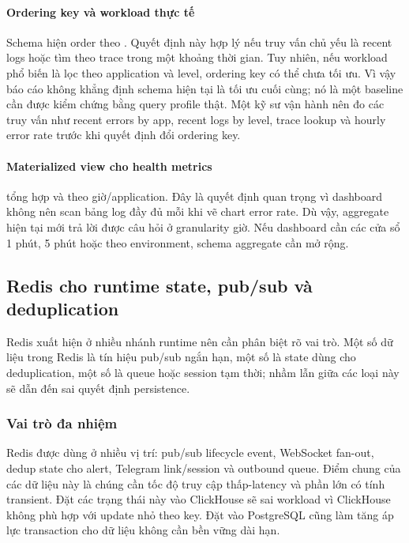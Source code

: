 \paragraph{Ordering key và workload thực tế}

Schema hiện order theo . Quyết định này hợp lý nếu truy vấn chủ yếu là recent logs hoặc tìm theo trace trong một khoảng thời gian. Tuy nhiên, nếu workload phổ biến là lọc theo application và level, ordering key có thể chưa tối ưu. Vì vậy báo cáo không khẳng định schema hiện tại là tối ưu cuối cùng; nó là một baseline cần được kiểm chứng bằng query profile thật. Một kỹ sư vận hành nên đo các truy vấn như recent errors by app, recent logs by level, trace lookup và hourly error rate trước khi quyết định đổi ordering key.

\paragraph{Materialized view cho health metrics}

 tổng hợp  và  theo giờ/application. Đây là quyết định quan trọng vì dashboard không nên scan bảng log đầy đủ mỗi khi vẽ chart error rate. Dù vậy, aggregate hiện tại mới trả lời được câu hỏi ở granularity giờ. Nếu dashboard cần các cửa sổ 1 phút, 5 phút hoặc theo environment, schema aggregate cần mở rộng.

\subsection{Redis cho runtime state, pub/sub và deduplication}

Redis xuất hiện ở nhiều nhánh runtime nên cần phân biệt rõ vai trò. Một số dữ liệu trong Redis là tín hiệu pub/sub ngắn hạn, một số là state dùng cho deduplication, một số là queue hoặc session tạm thời; nhầm lẫn giữa các loại này sẽ dẫn đến sai quyết định persistence.

\subsubsection{Vai trò đa nhiệm}

Redis được dùng ở nhiều vị trí: pub/sub lifecycle event, WebSocket fan-out, dedup state cho alert, Telegram link/session và outbound queue. Điểm chung của các dữ liệu này là chúng cần tốc độ truy cập thấp-latency và phần lớn có tính transient. Đặt các trạng thái này vào ClickHouse sẽ sai workload vì ClickHouse không phù hợp với update nhỏ theo key. Đặt vào PostgreSQL cũng làm tăng áp lực transaction cho dữ liệu không cần bền vững dài hạn.

